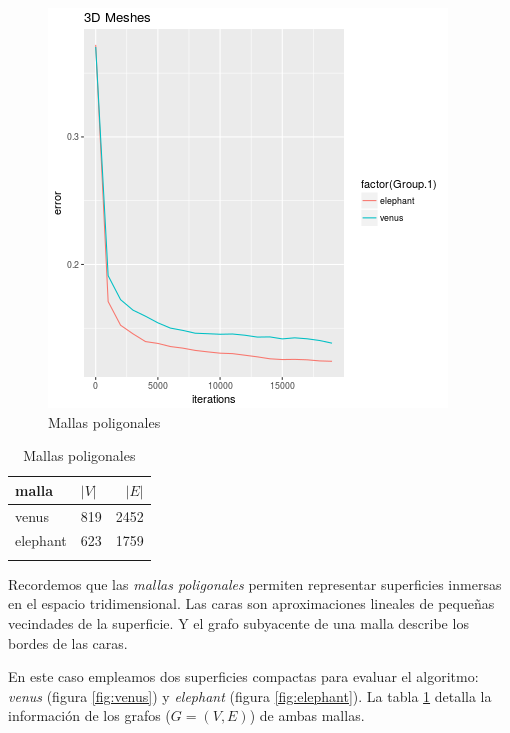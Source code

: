 \documentclass[conference,compsoc,a4paper]{IEEEtran}
\begin{document}
\begin{figure}
	\includegraphics[width=\linewidth]{3dmeshes.png} %
	\caption{Mallas poligonales}%
	\label{fig:meshes} %
\end{figure}

\begin{table}
	\caption{Mallas poligonales}
	\centering
	\begin{tabular}{llr}
		\toprule
		malla & $|V|$ & $|E|$ \\
		\midrule
		venus & 819 & 2452 \\
		elephant & 623 & 1759 \\
		\bottomrule
		\label{tab:meshes}
	\end{tabular}
\end{table}

Recordemos que las \textit{mallas poligonales} 
permiten representar superficies inmersas en el espacio tridimensional. 
Las caras son aproximaciones lineales de pequeñas vecindades de la 
superficie. Y el grafo subyacente de una malla describe los bordes de 
las caras. 

\smallskip

En este caso empleamos dos superficies compactas para evaluar el 
algoritmo: \emph{venus} (figura \ref{fig:venus}) y \emph{elephant} 
(figura \ref{fig:elephant}). La tabla \ref{tab:meshes} detalla la 
información de los grafos ($G=(V,E)$) de ambas mallas.
\end{document}

